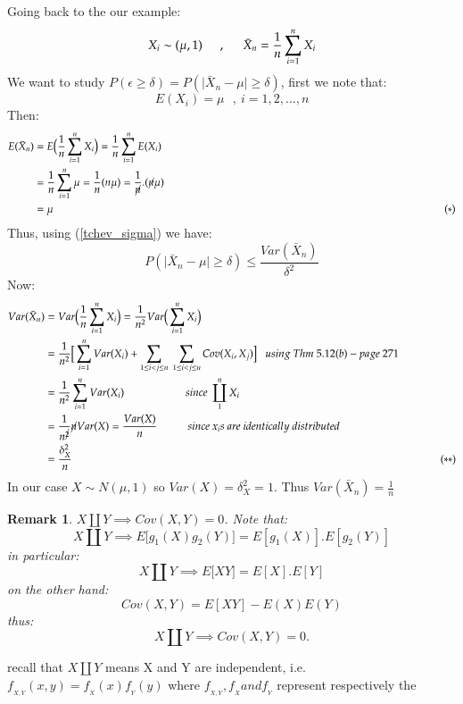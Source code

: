 \documentclass[14pt,twoside,a4paper,fleqn]{article}
\theoremstyle{plain}
\newtheorem*{remark*}{Remark}
\begin{document}
Going back to the our example:
$$X_i \sim (\mu, 1)\tab[0.5cm],\tab[0.5cm] \bar X_n = \frac{1}{n}\sum_{i=1}^{n} X_i$$
We want to study $P(\epsilon \geq \delta) = P(\vert \bar{X}_n - \mu\vert \geq \delta)$, first we note that: $$E(X_i)=\mu\ \ \ ,\ i=1,2,\ldots,n$$
Then:
	\begin{equation*}
	\begin{split}
		E(\bar{X}_n) &= E\big(\frac{1}{n}\sum_{i=1}^{n}X_i \big)=\frac{1}{n}\sum_{i=1}^{n}E(X_i)\\
		&= \frac{1}{n}\sum_{i=1}^{n} \mu =\frac{1}{n}(n\mu)= \frac{1}{\cancel{n}}.(\cancel{n}\mu)\\
		&= \mu\tab[13cm] (*)
	\end{split}
	\end{equation*}
Thus, using (\ref{tchev_sigma}) we have:
	$$P(\vert\bar{X}_n - \mu\vert \geq \delta ) \leq \frac{Var(\bar{X}_n)}{\delta^2}$$
Now:
	\begin{equation*}
	\begin{split}
	Var(\bar{X}_n) &= Var\big(\frac{1}{n} \sum_{i=1}^{n} X_i \big) = \frac{1}{n^2}Var\big(\sum_{i=1}^{n}X_i \big)\\
	&=\frac{1}{n^2}\Big[\sum_{i=1}^{n} Var(X_i) +\sum_{1\leq i<j\leq n}\ \sum_{1\leq i<j\leq n} Cov(X_i, X_j) \Big]\ \ \ using\ Thm\ 5.12(b)-page\ 271\\
	&=\frac{1}{n^2}\sum_{i=1}^{n}Var(X_i)\tab[2cm]since\ \coprod_{1}^{n}X_i\\
	&=\frac{1}{n^{\cancel{2}}} \cancel{n} Var(X) = \frac{Var(X)}{n} \tab since\ x_{i}s\ are\ identically\ distributed\\
	&=\frac{\delta_X^2}{n}\tab[12cm](**)
	\end{split}
	\end{equation*}
	In our case $X\sim N(\mu, 1)$ so $Var(X) = \delta_X^2 = 1$. Thus $Var(\bar{X}_n) = \frac{1}{n}$
	
\begin{remark*}
$X\coprod Y \implies Cov(X,Y)=0$. Note that:
$$X \coprod Y \implies E\big[g_1(X)g_2(Y)\big] = E[g_1(X)].E[g_2(Y)]$$
in particular:
$$X \coprod Y \implies E\big[XY\big] = E[X].E[Y]$$
on the other hand:
$$Cov(X,Y) = E[XY] - E(X)E(Y)$$
thus: 
$$X\coprod Y\implies Cov(X,Y)=0.$$
\end{remark*}
recall that $X\coprod Y$ means X and Y are independent, i.e. \mbox{$f_{_{X,Y}}(x,y)=f_{_X}(x)f_{_Y}(y)$} where $f_{_{X,Y}},f_{_X} and f_{_Y}$ represent respectively the %
\end{document}
